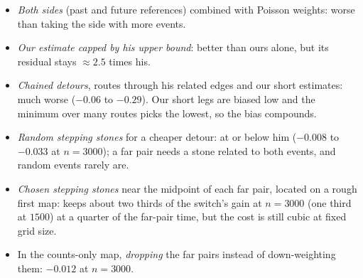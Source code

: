 \documentclass[11pt,a4paper]{article}
\begin{document}
\begin{itemize}[leftmargin=*,itemsep=1pt]
\item \emph{Both sides} (past and future references) combined with Poisson weights: worse than taking the side with more events.
\item \emph{Our estimate capped by his upper bound}: better than ours alone, but its residual stays $\approx2.5$ times his.
\item \emph{Chained detours}, routes through his related edges and our short estimates: much worse ($-0.06$ to $-0.29$). Our short legs are biased low and the minimum over many routes picks the lowest, so the bias compounds.
\item \emph{Random stepping stones} for a cheaper detour: at or below him ($-0.008$ to $-0.033$ at $n=3000$); a far pair needs a stone related to both events, and random events rarely are.
\item \emph{Chosen stepping stones} near the midpoint of each far pair, located on a rough first map: keeps about two thirds of the switch's gain at $n=3000$ (one third at $1500$) at a quarter of the far-pair time, but the cost is still cubic at fixed grid size.
\item In the counts-only map, \emph{dropping} the far pairs instead of down-weighting them: $-0.012$ at $n=3000$.
\end{itemize}
\end{document}
